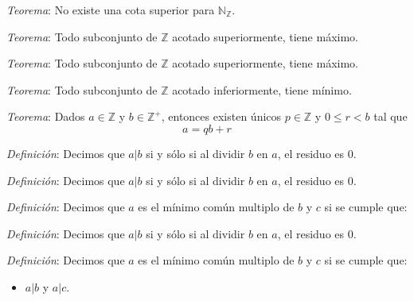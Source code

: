 \documentclass{beamer}
\begin{document}
  \begin{frame}
    \textit{Teorema}: No existe una cota superior para $\mathbb{N}_\mathbb{Z}$.
  \end{frame}

  \begin{frame}
    \textit{Teorema}: Todo subconjunto de $\mathbb{Z}$ acotado superiormente, tiene máximo.
  \end{frame}

  \begin{frame}
    \textit{Teorema}: Todo subconjunto de $\mathbb{Z}$ acotado superiormente, tiene máximo.
    \newline\newline

    \textit{Teorema}: Todo subconjunto de $\mathbb{Z}$ acotado inferiormente, tiene mínimo.
  \end{frame}

  \begin{frame}
    \textit{Teorema}: Dados $a \in \mathbb{Z}$ y $b \in \mathbb{Z}^+$, entonces 
    existen únicos $p \in \mathbb{Z}$ y $0 \leq r < b$ tal que 
    \[a = qb + r\]
  \end{frame}

  \begin{frame}
    \textit{Definición}: Decimos que $a|b$ si y sólo si al dividir $b$ en $a$, el 
    residuo es $0$.
  \end{frame}

  \begin{frame}
    \textit{Definición}: Decimos que $a|b$ si y sólo si al dividir $b$ en $a$, el 
    residuo es $0$.
    \newline\newline

    \textit{Definición}: Decimos que $a$ es el mínimo común multiplo 
    de $b$ y $c$ si se cumple que:
  \end{frame}

  \begin{frame}
    \textit{Definición}: Decimos que $a|b$ si y sólo si al dividir $b$ en $a$, el 
    residuo es $0$.
    \newline\newline

    \textit{Definición}: Decimos que $a$ es el mínimo común multiplo 
    de $b$ y $c$ si se cumple que:
    \begin{itemize}
      \item $a|b$ y $a|c$.
    \end{itemize}
  \end{frame}
\end{document}
